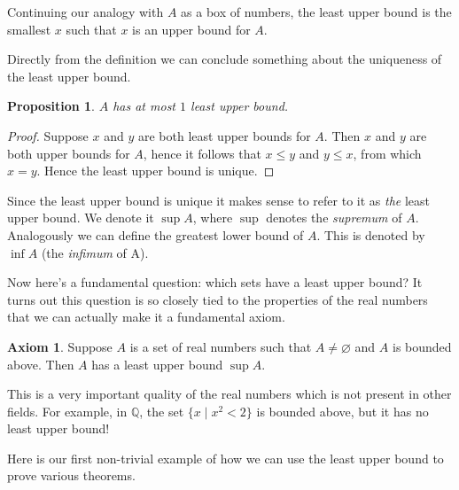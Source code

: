 \documentclass[12pt]{article}
\theoremstyle{definition}
\newtheorem{axm}{Axiom}
\theoremstyle{plain}
\newtheorem{prop}{Proposition}
\begin{document}
Continuing our analogy with $A$ as a box of numbers, the least upper bound is the smallest $x$ such that $x$ is an upper bound for $A$.

Directly from the definition we can conclude something about the uniqueness of the least upper bound.
\begin{prop}
	$A$ has at most $1$ least upper bound.
\end{prop}
\begin{proof}
	Suppose $x$ and $y$ are both least upper bounds for $A$. Then $x$ and $y$ are both upper bounds for $A$, hence it follows that $x \leq y$ and $y \leq x$, from which $x = y$. Hence the least upper bound is unique.
\end{proof}

Since the least upper bound is unique it makes sense to refer to it as \textit{the} least upper bound. We denote it $\sup{A}$, where $\sup$ denotes the \textit{supremum} of $A$. 
Analogously we can define the greatest lower bound of $A$. This is denoted by $\inf{A}$ (the \textit{infimum} of A).

Now here's a fundamental question: which sets have a least upper bound? It turns out this question is so closely tied to the properties of the real numbers that we can actually make it a fundamental axiom.

\begin{axm}
Suppose $A$ is a set of real numbers such that $A \neq \varnothing$ and $A$ is bounded above. Then $A$ has a least upper bound $\sup{A}$.
\end{axm}

This is a very important quality of the real numbers which is not present in other fields. For example, in $\mathbb{Q}$, the set $\{x \mid x^2 < 2\}$ is bounded above, but it has no least upper bound!

Here is our first non-trivial example of how we can use the least upper bound to prove various theorems.
\end{document}
